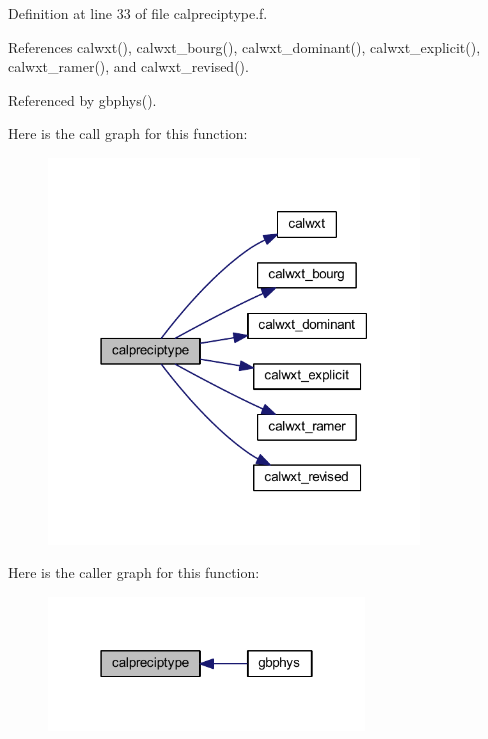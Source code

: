 Definition at line 33 of file calpreciptype.\+f.



References calwxt(), calwxt\+\_\+bourg(), calwxt\+\_\+dominant(), calwxt\+\_\+explicit(), calwxt\+\_\+ramer(), and calwxt\+\_\+revised().



Referenced by gbphys().



Here is the call graph for this function\+:
\nopagebreak
\begin{figure}[H]
\begin{center}
\leavevmode
\includegraphics[width=279pt]{calpreciptype_8f_a8a471b8f23f55928b69814c887ec925a_cgraph}
\end{center}
\end{figure}




Here is the caller graph for this function\+:
\nopagebreak
\begin{figure}[H]
\begin{center}
\leavevmode
\includegraphics[width=238pt]{calpreciptype_8f_a8a471b8f23f55928b69814c887ec925a_icgraph}
\end{center}
\end{figure}


